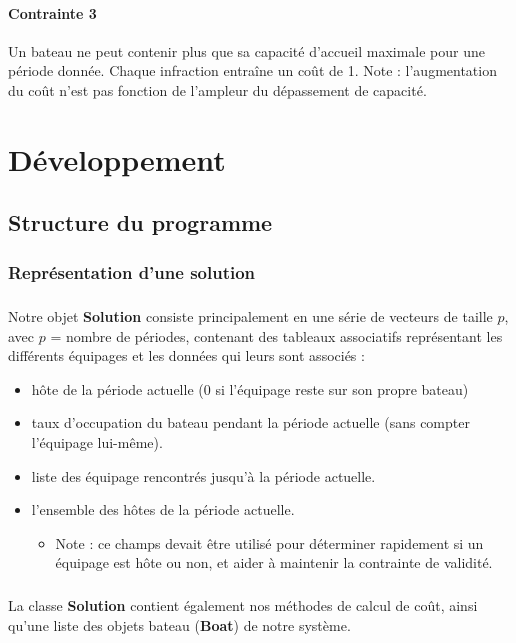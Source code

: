 \documentclass[a4paper,10pt]{report}
\begin{document}
\subsubsection{Contrainte 3}
Un bateau ne peut contenir plus que sa capacité d'accueil maximale pour une période donnée. Chaque infraction
entraîne un coût de 1. Note : l'augmentation du coût n'est pas fonction de l'ampleur du dépassement 
de capacité.


\pagebreak
\chapter{Développement}
\section{Structure du programme}
\subsection{Représentation d'une solution}
\paragraph{}
Notre objet \textbf{Solution} consiste principalement en une série de vecteurs de taille $p$,
avec $p$ = nombre de périodes, contenant des tableaux associatifs représentant les différents
équipages et les données qui leurs sont associés :
\begin{itemize}
	\item hôte de la période actuelle (0 si l'équipage reste sur son propre bateau)
	\item taux d'occupation du bateau pendant la période actuelle (sans compter l'équipage lui-même).
	\item liste des équipage rencontrés jusqu'à la période actuelle.
	\item l'ensemble des hôtes de la période actuelle.
	\begin{itemize}
		\item Note : ce champs devait être utilisé pour déterminer rapidement si un équipage est
		hôte ou non, et aider à maintenir la contrainte de validité.
	\end{itemize}
\end{itemize}

\paragraph{}
La classe \textbf{Solution} contient également nos méthodes de calcul de coût, ainsi qu'une liste
des objets bateau (\textbf{Boat}) de notre système.
\end{document}
